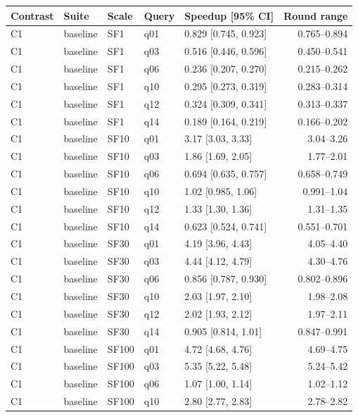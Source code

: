 \begin{longtable}{lllllr}
\toprule
Contrast & Suite & Scale & Query & Speedup [95\% CI] & Round range \\
\midrule
\endhead
\bottomrule
\endfoot
C1 & baseline & SF1 & q01 & 0.829 [0.745, 0.923] & 0.765--0.894 \\
C1 & baseline & SF1 & q03 & 0.516 [0.446, 0.596] & 0.450--0.541 \\
C1 & baseline & SF1 & q06 & 0.236 [0.207, 0.270] & 0.215--0.262 \\
C1 & baseline & SF1 & q10 & 0.295 [0.273, 0.319] & 0.283--0.314 \\
C1 & baseline & SF1 & q12 & 0.324 [0.309, 0.341] & 0.313--0.337 \\
C1 & baseline & SF1 & q14 & 0.189 [0.164, 0.219] & 0.166--0.202 \\
C1 & baseline & SF10 & q01 & 3.17 [3.03, 3.33] & 3.04--3.26 \\
C1 & baseline & SF10 & q03 & 1.86 [1.69, 2.05] & 1.77--2.01 \\
C1 & baseline & SF10 & q06 & 0.694 [0.635, 0.757] & 0.658--0.749 \\
C1 & baseline & SF10 & q10 & 1.02 [0.985, 1.06] & 0.991--1.04 \\
C1 & baseline & SF10 & q12 & 1.33 [1.30, 1.36] & 1.31--1.35 \\
C1 & baseline & SF10 & q14 & 0.623 [0.524, 0.741] & 0.551--0.701 \\
C1 & baseline & SF30 & q01 & 4.19 [3.96, 4.43] & 4.05--4.40 \\
C1 & baseline & SF30 & q03 & 4.44 [4.12, 4.79] & 4.30--4.76 \\
C1 & baseline & SF30 & q06 & 0.856 [0.787, 0.930] & 0.802--0.896 \\
C1 & baseline & SF30 & q10 & 2.03 [1.97, 2.10] & 1.98--2.08 \\
C1 & baseline & SF30 & q12 & 2.02 [1.93, 2.12] & 1.97--2.11 \\
C1 & baseline & SF30 & q14 & 0.905 [0.814, 1.01] & 0.847--0.991 \\
C1 & baseline & SF100 & q01 & 4.72 [4.68, 4.76] & 4.69--4.75 \\
C1 & baseline & SF100 & q03 & 5.35 [5.22, 5.48] & 5.24--5.42 \\
C1 & baseline & SF100 & q06 & 1.07 [1.00, 1.14] & 1.02--1.12 \\
C1 & baseline & SF100 & q10 & 2.80 [2.77, 2.83] & 2.78--2.82 \\

\end{longtable}
